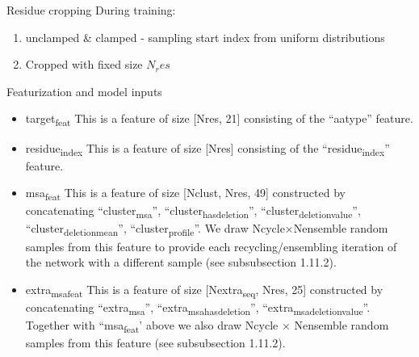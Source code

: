 \documentclass[presentation, smaller]{beamer}
\begin{document}
\begin{frame}[label={sec:org2fbaab8}]{Residue cropping \cite{jumperHighlyAccurateProtein2021}}
During training:
\begin{enumerate}
\item unclamped \& clamped - sampling start index from uniform distributions
\item Cropped with fixed size \(N_res\)
\end{enumerate}
\end{frame}

\begin{frame}[label={sec:org6a2235d}]{Featurization and model inputs \cite{jumperHighlyAccurateProtein2021}}
\begin{itemize}
\item \alert{target\textsubscript{feat}}
This is a feature of size [Nres, 21] consisting of the “aatype” feature.
\item \alert{residue\textsubscript{index}}
This is a feature of size [Nres] consisting of the “residue\textsubscript{index}” feature.
\item \alert{msa\textsubscript{feat}}
This is a feature of size [Nclust, Nres, 49] constructed by concatenating “cluster\textsubscript{msa}”, “cluster\textsubscript{has}\textsubscript{deletion}”, “cluster\textsubscript{deletion}\textsubscript{value}”, “cluster\textsubscript{deletion}\textsubscript{mean}”, “cluster\textsubscript{profile}”. We draw Ncycle×Nensemble random samples from this feature to provide each recycling/ensembling iteration of the network with a different sample (see subsubsection 1.11.2).
\item \alert{extra\textsubscript{msa}\textsubscript{feat}}
This is a feature of size [Nextra\textsubscript{seq}, Nres, 25] constructed by concatenating “extra\textsubscript{msa}”, “extra\textsubscript{msa}\textsubscript{has}\textsubscript{deletion}”, “extra\textsubscript{msa}\textsubscript{deletion}\textsubscript{value}”. Together with “msa\textsubscript{feat}’ above we also draw Ncycle × Nensemble random samples from this feature (see subsubsection 1.11.2).
\end{itemize}
\end{frame}
\end{document}
